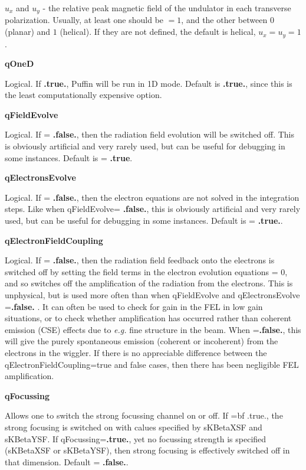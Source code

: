 \documentclass[12pt]{article}%
\begin{document}
$u_x$ and $u_y$ - the relative peak magnetic field of the undulator in each transverse polarization. Usually, at least one should be $=1$, and the other between $0$ (planar) and $1$ (helical). If they are not defined, the default is helical, $u_x=u_y=1$.


{\bf qOneD}

Logical. If  {\bf .true.}, Puffin will be run in 1D mode. Default is  {\bf .true.}, since this is the least computationally expensive option.

{\bf qFieldEvolve}

Logical. If = {\bf .false.}, then the radiation field evolution will be switched off. This is obviously artificial and very rarely used, but can be useful for debugging in some instances. Default is = {\bf .true}.

{\bf qElectronsEvolve}

Logical. If = {\bf .false.}, then the electron equations are not solved in the integration steps. Like when qFieldEvolve= {\bf .false.},  this is obviously artificial and very rarely used, but can be useful for debugging in some instances. Default is = {\bf .true.}.

{\bf qElectronFieldCoupling}

Logical. If = {\bf .false.}, then the radiation field feedback onto the electrons is switched off by setting the field terms in the electron evolution equations = 0, and so switches off the amplification of the radiation from the electrons. This is unphysical, but is used more often than when qFieldEvolve and qElectronsEvolve ={\bf .false.} . It can often be used to check for gain in the FEL in low gain situations, or to check whether amplification has occurred rather than coherent emission (CSE) effects due to \textit{e.g.} fine structure in the beam. When ={\bf .false.}, this will give the purely spontaneous emission (coherent or incoherent) from the electrons in the wiggler. If there is no appreciable difference between the qElectronFieldCoupling=true and false cases, then there has been negligible FEL amplification.

{\bf qFocussing}

Allows one to switch the strong focussing channel on or off. If ={bf .true.}, the strong focusing is switched on with calues specified by sKBetaXSF and sKBetaYSF. If qFocussing={\bf .true.}, yet no focussing strength is specified (sKBetaXSF or sKBetaYSF), then strong focusing is effectively switched off in that dimension. Default = {\bf .false.}.
\end{document}
